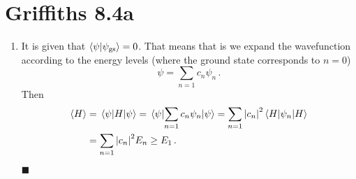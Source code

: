 \documentclass[11pt]{article}
\begin{document}
\newpage

\section*{Griffiths 8.4a}
\begin{enumerate}[label=\alph*)]
\item It is given that $\braket{\psi}{\psi_\text{gs}} = 0$. That means that is we expand the wavefunction according to the energy levels (where the ground state corresponds to $n = 0$)
\[\psi = \sum_{n=1} c_n\psi_n \, . \]
Then
\begin{align*}
\ev{H} & = \ev{H}{\psi} = \ev{\sum_{n=1} c_n\psi_n}{\psi} = \sum_{n=1}\abs{c_n}^2 \ev{\psi_n}{H}\\
& = \sum_{n=1}\abs{c_n}^2 E_n \geq E_1 \, . 
\end{align*}
\hfill $\blacksquare$
\end{enumerate}

\newpage
\end{document}
